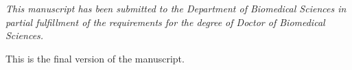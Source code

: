 
\vspace*{\fill}
\begin{center}
{\it This manuscript has been submitted to the Department of Biomedical Sciences 
in partial fulfillment of the requirements for the degree of Doctor of Biomedical Sciences.

\vskip1cm

This is the final version of the manuscript.
}%
\end{center}
\vspace*{\fill}
\vspace*{\fill}
\vspace*{\fill}

